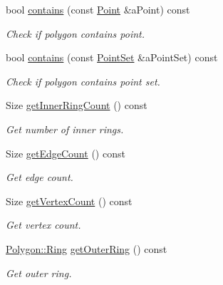 \begin{DoxyCompactItemize}
bool \hyperlink{classlibrary_1_1math_1_1geom_1_1d2_1_1objects_1_1_polygon_a9a59a791536ec6ca38fe75d378aadc8e}{contains} (const \hyperlink{classlibrary_1_1math_1_1geom_1_1d2_1_1objects_1_1_point}{Point} \&a\+Point) const
\begin{DoxyCompactList}\small\item\em Check if polygon contains point. \end{DoxyCompactList}\item 
bool \hyperlink{classlibrary_1_1math_1_1geom_1_1d2_1_1objects_1_1_polygon_a750ce732c80c9efafa534fc3ae9d8a6f}{contains} (const \hyperlink{classlibrary_1_1math_1_1geom_1_1d2_1_1objects_1_1_point_set}{Point\+Set} \&a\+Point\+Set) const
\begin{DoxyCompactList}\small\item\em Check if polygon contains point set. \end{DoxyCompactList}\item 
Size \hyperlink{classlibrary_1_1math_1_1geom_1_1d2_1_1objects_1_1_polygon_a20d245deda49667f0418591d7772d53d}{get\+Inner\+Ring\+Count} () const
\begin{DoxyCompactList}\small\item\em Get number of inner rings. \end{DoxyCompactList}\item 
Size \hyperlink{classlibrary_1_1math_1_1geom_1_1d2_1_1objects_1_1_polygon_ac01b8f978e663f09ef0f7a91de7720ce}{get\+Edge\+Count} () const
\begin{DoxyCompactList}\small\item\em Get edge count. \end{DoxyCompactList}\item 
Size \hyperlink{classlibrary_1_1math_1_1geom_1_1d2_1_1objects_1_1_polygon_aece2a526c36bbd641588e9742228fb08}{get\+Vertex\+Count} () const
\begin{DoxyCompactList}\small\item\em Get vertex count. \end{DoxyCompactList}\item 
\hyperlink{classlibrary_1_1math_1_1geom_1_1d2_1_1objects_1_1_polygon_aa543e7078b73e1d307ca8317d765cd9c}{Polygon\+::\+Ring} \hyperlink{classlibrary_1_1math_1_1geom_1_1d2_1_1objects_1_1_polygon_a3074bceaa8841e79c843d46377195a0d}{get\+Outer\+Ring} () const
\begin{DoxyCompactList}\small\item\em Get outer ring. \end{DoxyCompactList}\item 

\end{DoxyCompactItemize}
